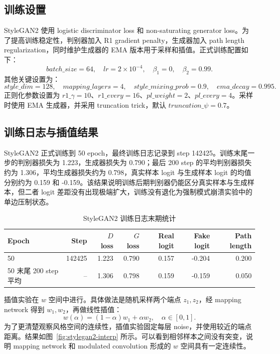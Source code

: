 \documentclass[UTF8,a4paper,12pt]{ctexart}
\begin{document}
\subsection{训练设置}

StyleGAN2 使用 logistic discriminator loss 和 non-saturating generator loss。为了提高训练稳定性，判别器加入 R1 gradient penalty，生成器加入 path length regularization，同时维护生成器的 EMA 版本用于采样和插值。正式训练配置如下：
\begin{equation}
batch\_size=64,\quad lr=2\times10^{-4},\quad \beta_1=0,\quad \beta_2=0.99.
\end{equation}
其他关键设置为：
\begin{equation}
style\_dim=128,\quad mapping\_layers=4,\quad style\_mixing\_prob=0.9,\quad ema\_decay=0.995.
\end{equation}
正则化参数设置为 $r1\_\gamma=10$、$r1\_every=16$、$pl\_weight=2$、$pl\_every=4$。采样时使用 EMA 生成器，并采用 truncation trick，默认 $truncation\_\psi=0.7$。

\subsection{训练日志与插值结果}

StyleGAN2 正式训练到 50 epoch，最终训练日志记录到 step 142425。训练末尾一步的判别器损失为 1.223，生成器损失为 0.790；最后 200 step 的平均判别器损失约为 1.306，平均生成器损失约为 0.798，真实样本 logit 与生成样本 logit 的均值分别约为 0.159 和 -0.159。该结果说明训练后期判别器仍能区分真实样本与生成样本，但二者 logit 差距没有出现极端扩大，训练没有退化为强制模式崩溃实验中的单边压制状态。

\begin{table}[H]
\centering
\caption{StyleGAN2 训练日志末期统计}
\label{tab:stylegan2-log}
\begin{tabular}{lrrrrrr}
\toprule
Epoch & Step & $D$ loss & $G$ loss & Real logit & Fake logit & Path length \\
\midrule
50 & 142425 & 1.223 & 0.790 & 0.157 & -0.204 & 0.200 \\
50 末尾 200 step 平均 & -- & 1.306 & 0.798 & 0.159 & -0.159 & 0.050 \\
\bottomrule
\end{tabular}
\end{table}

插值实验在 $w$ 空间中进行。具体做法是随机采样两个端点 $z_1,z_2$，经 mapping network 得到 $w_1,w_2$，再做线性插值：
\begin{equation}
    w(\alpha)=(1-\alpha)w_1+\alpha w_2,\quad \alpha\in[0,1].
\end{equation}
为了更清楚观察风格空间的连续性，插值实验固定每层 noise，并使用较近的端点距离。结果如图~\ref{fig:stylegan2-interp} 所示。可以看到相邻样本之间没有突变，说明 mapping network 和 modulated convolution 形成的 $w$ 空间具有一定连续性。
\end{document}
